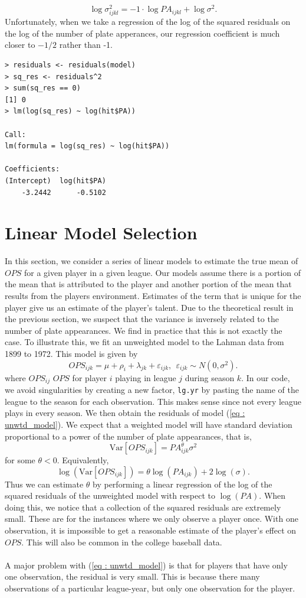 \documentclass [52pt] {article}
\newcommand{\var}{\text{Var}}
\begin{document}
\[\log\sigma^2_{ijkl} = -1\cdot \log PA_{ijkl} + \log\sigma^2.\]
Unfortunately, when we take a regression of the log of the squared residuals on the log of the number of plate apperances, our regression coefficient is much closer to $-1/2$ rather than -1.
\begin{verbatim}
> residuals <- residuals(model)
> sq_res <- residuals^2
> sum(sq_res == 0)
[1] 0
> lm(log(sq_res) ~ log(hit$PA))

Call:
lm(formula = log(sq_res) ~ log(hit$PA))

Coefficients:
(Intercept)  log(hit$PA)  
    -3.2442      -0.5102
   \end{verbatim}

\section{Linear Model Selection}
In this section, we consider a series of linear models to estimate the true mean of $OPS$ for a given player in a given league.  Our models assume there is a portion of the mean that is attributed to the player and another portion of the mean that results from the players environment.  Estimates of the term that is unique for the player give us an estimate of the player's talent.  Due to the theoretical result in the previous section, we suspect that the variance is inversely related to the number of plate appearances.  We find in practice that this is not exactly the case.  To illustrate this, we fit an unweighted model to the Lahman data from 1899 to 1972.  This model is given by
\begin{equation}\label{eq : unwtd_model}
OPS_{ijk} = \mu+\rho_i+\lambda_{jk} +\varepsilon_{ijk}, \:\:\varepsilon_{ijk}\sim N(0, \sigma^2).
\end{equation}
where $OPS_{ij}$ $OPS$ for player $i$ playing in league $j$ during season $k$.  In our code, we avoid singularities by creating a new factor, \verb|lg.yr| by pasting the name of the league to the season for each observation.  This makes sense since not every league plays in every season.  We then obtain the residuals of model (\ref{eq : unwtd_model}).  We expect that a weighted model will have standard deviation proportional to a power of the number of plate appearances, that is, 
\[\var[OPS_{ijk}] = PA_{ijk}^{\theta}\sigma^2\]
for some $\theta <0$.  Equivalently, 
\[\log(\text{Var}[OPS_{ijk}]) = {\theta}\log(PA_{ijk}) + 2\log(\sigma).\]
Thus we can estimate $\theta$ by performing a linear regression of the log of the squared residuals of the unweighted model with respect to $\log(PA)$.  When doing this, we notice that a collection of the squared residuals are extremely small.  These are for the instances where we only observe a player once.  With one observation, it is impossible to get a reasonable estimate of the player's effect on $OPS$.  This will also be common in the college baseball data.
\\\\
A major problem with (\ref{eq : unwtd_model}) is that for players that have only one observation, the residual is very small.  This is because there many observations of a particular league-year, but only one observation for the player.
\end{document}
